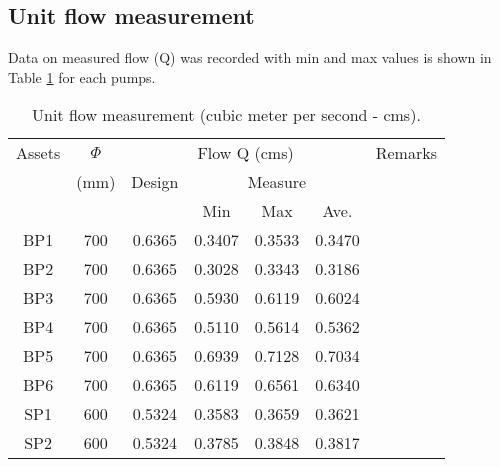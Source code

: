 \subsection{Unit flow measurement} \label{ch04mech04}

Data on measured flow (Q) was recorded with min and max values is shown in Table \ref{ch04_tbl_flow01} for each pumps. %



\begin{table}[!h]

	\caption{Unit flow measurement (cubic meter per second - cms).}

	\label{ch04_tbl_flow01}

	{\footnotesize

\begin{tabular}{c|c|c|c|c|c|l}

	\hline

	Assets & $\Phi$  & \multicolumn{4}{c|}{Flow Q (cms)} & Remarks \\ 

	\cline{3-6}

	& (mm) & Design & \multicolumn{3}{c|}{Measure} &  \\ 

	\cline{4-6}

	&  &  & Min & Max & Ave. &  \\ 

	\hline

	BP1 & 700 & 0.6365 & 0.3407 & 0.3533 & 0.3470  &  \\ 

	BP2 & 700 & 0.6365 & 0.3028 & 0.3343 & 0.3186  &  \\ 

	BP3 & 700 & 0.6365 & 0.5930 & 0.6119 & 0.6024  &  \\ 

	BP4 & 700 & 0.6365 & 0.5110 & 0.5614 & 0.5362  &  \\ 

	BP5 & 700 & 0.6365 & 0.6939 & 0.7128 & 0.7034  &  \\ 

	BP6 & 700 & 0.6365 & 0.6119 & 0.6561 & 0.6340  &  \\ 

	SP1 & 600 & 0.5324 & 0.3583 & 0.3659 & 0.3621  &  \\ 

	SP2 & 600 & 0.5324 & 0.3785 & 0.3848 & 0.3817  &  \\ 

	\hline

\end{tabular}

	}

\end{table}



